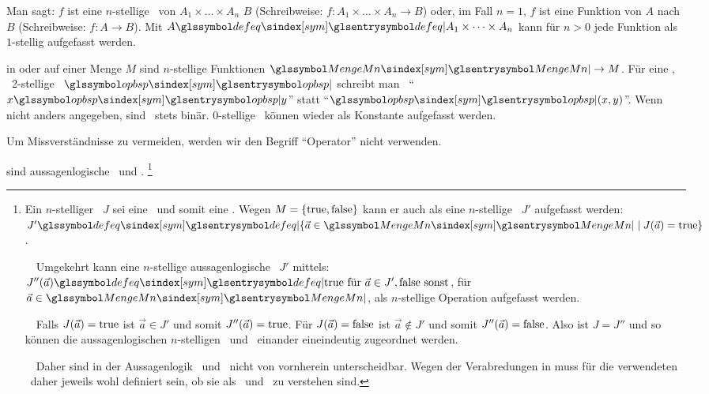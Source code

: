 \begin{description}
	Man sagt: $f$ ist eine $n$-stellige \Funktion\ von $A_1 \times \dots \times A_n$  $B$ (Schreibweise: $f : A_1 \times \dots \times A_n \rightarrow B$) oder, im Fall $n=1$, $f$ ist eine Funktion von $A$ nach $B$ (Schreibweise: $f : A \rightarrow B$).
	Mit $A \symdefeq A_1 \times \dots \times A_n$ kann für $n > 0$ jede Funktion als $1$-stellig aufgefasst werden.

	\item [\Operationen] in oder auf einer Menge $M$ sind $n$-stellige Funktionen $\symMengeMn \rightarrow M$.
	Für eine , \textdh\ 2-stellige \Operation\ $\symopbsp$ schreibt man \textiAlg\ \enquote{$x \symopbsp y$} statt \enquote{$\symopbsp(x,y)$}.
	Wenn nicht anders angegeben, sind \Operationen\ stets binär.
	0-stellige \Operationen\ können wieder als Konstante aufgefasst werden.

	Um Missverständnisse zu vermeiden, werden wir den Begriff \enquote{Operator} nicht verwenden.

	\item [\Junktoren] sind aussagenlogische \Relationen\ und \Operationen.%
	\footnote{\label{def-Junktor}%
		Ein $n$-stelliger \Junktor\ $J$ sei eine \Operation\ und somit eine \Funktion.
		Wegen $M = \{\mathrm{true},\mathrm{false}\}$ kann er auch als eine $n$-stellige \Relation\ $J'$ aufgefasst werden:
		$J' \symdefeq \{\vec{a} \in \symMengeMn \mid J(\vec{a}) = \true\}$.

		~~Umgekehrt kann eine $n$-stellige aussagenlogische \Relation\ $J'$ mittels:
		$J''(\vec{a}) \symdefeq \true \text{ für } \vec{a} \in J', \false \text{ sonst}$, für $\vec{a} \in \symMengeMn$, als $n$-stellige Operation aufgefasst werden.

		~~Falls $J(\vec{a})=\mathrm{true}$ ist $\vec{a} \in J'$ und somit $J''(\vec{a})=\mathrm{true}$.
		Für $J(\vec{a})=\mathrm{false}$ ist $\vec{a} \notin J'$ und somit $J''(\vec{a})=\mathrm{false}$.
		Also ist $J=J''$ und so können die aussagenlogischen $n$-stelligen \Relationen\ und \Operationen\ einander eineindeutig zugeordnet werden.

		~~Daher sind in der Aussagenlogik \Relationen\ und \Operationen\ nicht von vornherein unterscheidbar.
		Wegen der Verabredungen in  muss für die verwendeten \Junktoren\ daher jeweils wohl definiert sein, ob sie als \Relation\ und \Operation\ zu verstehen sind.
	}
\end{description}


